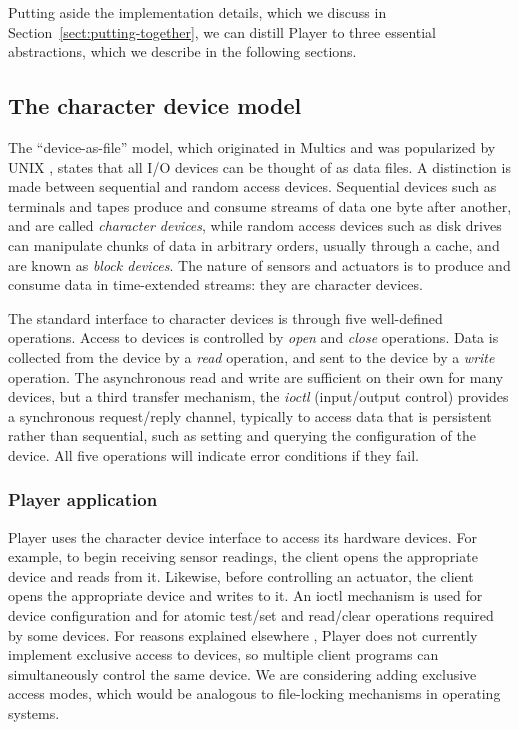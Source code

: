 \documentclass[letterpaper, 10 pt, conference]{iros03}
\begin{document}
Putting aside the implementation details, which we discuss in
Section~\ref{sect:putting-together}, we can distill Player to three
essential abstractions, which we describe in the following sections.

\subsection{The character device model}
\label{sect:r-w-ioctl}

The ``device-as-file'' model, which originated in Multics
\cite{FeiertagOrganick71} and was popularized by UNIX
\cite{RitchieThompson74}, states that all I/O devices can be thought of
as data files. A distinction is made between sequential and random
access devices. Sequential devices such as terminals and tapes produce
and consume streams of data one byte after another, and are called
{\em character devices}, while random access devices such as disk
drives can manipulate chunks of data in arbitrary orders, usually
through a cache, and are known as {\em block devices}. The nature of
sensors and actuators is to produce and consume data in time-extended
streams: they are character devices.

The standard interface to character devices is through five
well-defined operations. Access to devices is controlled by {\em open}
and {\em close} operations. Data is collected from the device by a
{\em read} operation, and sent to the device by a {\em write}
operation.  The asynchronous read and write are sufficient on their
own for many devices, but a third transfer mechanism, the {\em ioctl}
(input/output control) provides a synchronous request/reply channel,
typically to access data that is persistent rather than sequential,
such as setting and querying the configuration of the device. All five
operations will indicate error conditions if they fail.

\subsubsection{Player application}
Player uses the character device interface to access its hardware
devices.  For example, to begin receiving sensor readings, the client
opens the appropriate device and reads from it.  Likewise, before
controlling an actuator, the client opens the appropriate device and
writes to it. An ioctl mechanism is used for device configuration and
for atomic test/set and read/clear operations required by some
devices. For reasons explained elsewhere
\cite{GerkeyVaughan01a,GerkeyVaughanHoward03}, Player does not
currently implement exclusive access to devices, so multiple client
programs can simultaneously control the same device.  We are
considering adding exclusive access modes, which would be analogous to
file-locking mechanisms in operating systems.
\end{document}
